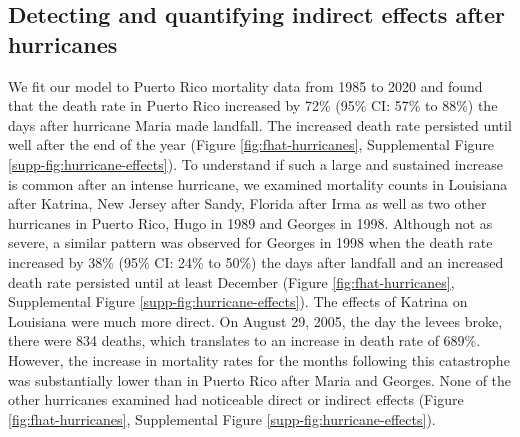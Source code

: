 \documentclass[11pt]{article}
\begin{document}
\subsection{Detecting and quantifying indirect effects after hurricanes}
\label{subsec:effects}
We fit our model to Puerto Rico mortality data from 1985 to 2020 and found that the death rate in Puerto Rico increased by 72\% (95\% CI: 57\% to 88\%) the days after hurricane Maria made landfall. The increased death rate persisted until well after the end of the year (Figure \ref{fig:fhat-hurricanes}, Supplemental Figure \ref{supp-fig:hurricane-effects}). To understand if such a large and sustained increase is common after an intense hurricane, we examined mortality counts in Louisiana after Katrina, New Jersey after Sandy, Florida after Irma as well as two other hurricanes in Puerto Rico, Hugo in 1989 and Georges in 1998.  Although not as severe, a similar pattern was observed for Georges in 1998 when the death rate increased by 38\% (95\% CI: 24\% to 50\%) the days after landfall and an increased death rate persisted until at least December (Figure \ref{fig:fhat-hurricanes}, Supplemental Figure \ref{supp-fig:hurricane-effects}). The effects of Katrina on Louisiana were much more direct. On August 29, 2005, the day the levees broke, there were 834 deaths, which translates to an increase in death rate of 689\%. However, the increase in mortality rates for the months following this catastrophe was substantially lower than in Puerto Rico after Maria and Georges. None of the other hurricanes examined had noticeable direct or indirect effects (Figure \ref{fig:fhat-hurricanes}, Supplemental Figure \ref{supp-fig:hurricane-effects}).
\end{document}
